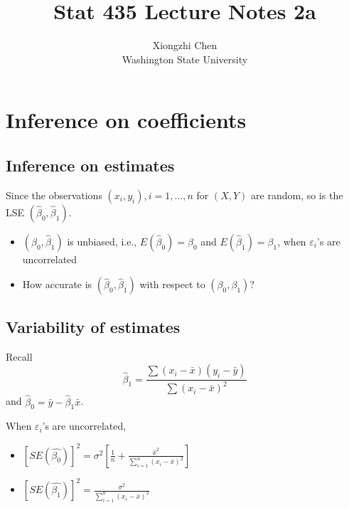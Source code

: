 \documentclass[]{article}
\title{Stat 435 Lecture Notes 2a}
\author{Xiongzhi Chen \\ Washington State University}
\date{}
\providecommand{\tightlist}{%
  \setlength{\itemsep}{0pt}\setlength{\parskip}{0pt}}
\begin{document}
\maketitle

{
\setcounter{tocdepth}{2}
\tableofcontents
}
\section{}\label{section}

\section{Inference on coefficients}\label{inference-on-coefficients}

\subsection{Inference on estimates}\label{inference-on-estimates}

Since the observations \((x_i,y_i),i=1,\ldots,n\) for \((X,Y)\) are
random, so is the LSE \(\left(\hat{\beta}_0,\hat{\beta}_1\right)\).

\begin{itemize}
\item
  \(\left(\hat{\beta}_0,\hat{\beta}_1\right)\) is unbiased, i.e.,
  \(E(\hat{\beta}_0)=\beta_0\) and \(E(\hat{\beta}_1)=\beta_1\), when
  \(\varepsilon_i\)'s are uncorrelated
\item
  How accurate is \(\left(\hat{\beta}_0,\hat{\beta}_1\right)\) with
  respect to \(({\beta}_0,{\beta}_1)\)?
\end{itemize}

\subsection{Variability of estimates}\label{variability-of-estimates}

Recall
\[\hat{\beta}_1 = \frac{\sum (x_i - \bar{x})(y_i - \bar{y})}{\sum (x_i - \bar{x})^2}\]
and \(\hat{\beta}_0 = \bar{y} - \hat{\beta}_1 \bar{x}\).

When \(\varepsilon_i\)'s are uncorrelated,

\begin{itemize}
\tightlist
\item
  \([SE(\hat{\beta_0})]^2 = \sigma^2 \left[\frac{1}{n}+\frac{\bar{x}^2}{\sum_{i=1}^n(x_i - {\bar{x}})^2}\right]\)
\item
  \([SE(\hat{\beta_1})]^2 = \frac{\sigma^2}{\sum_{i=1}^n(x_i - \bar{x})^2}\)
\end{itemize}
\end{document}
